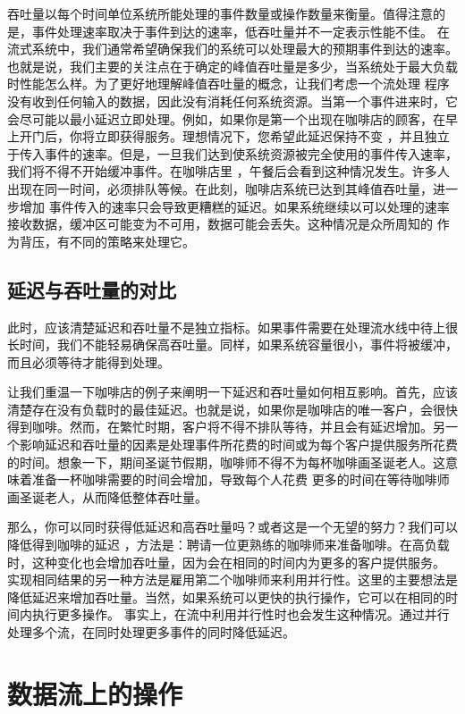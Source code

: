 \documentclass[cn,11pt,chinese]{elegantbook}
\begin{document}
吞吐量以每个时间单位系统所能处理的事件数量或操作数量来衡量。值得注意的是，事件处理速率取决于事件到达的速率，低吞吐量并不一定表示性能不佳。 在流式系统中，我们通常希望确保我们的系统可以处理最大的预期事件到达的速率。也就是说，我们主要的关注点在于确定的峰值吞吐量是多少，当系统处于最大负载时性能怎么样。为了更好地理解峰值吞吐量的概念，让我们考虑一个流处理 程序没有收到任何输入的数据，因此没有消耗任何系统资源。当第一个事件进来时，它会尽可能以最小延迟立即处理。例如，如果你是第一个出现在咖啡店的顾客，在早上开门后，你将立即获得服务。理想情况下，您希望此延迟保持不变 ，并且独立于传入事件的速率。但是，一旦我们达到使系统资源被完全使用的事件传入速率，我们将不得不开始缓冲事件。在咖啡店里 ，午餐后会看到这种情况发生。许多人出现在同一时间，必须排队等候。在此刻，咖啡店系统已达到其峰值吞吐量，进一步增加 事件传入的速率只会导致更糟糕的延迟。如果系统继续以可以处理的速率接收数据，缓冲区可能变为不可用，数据可能会丢失。这种情况是众所周知的 作为背压，有不同的策略来处理它。

\subsection{延迟与吞吐量的对比}

此时，应该清楚延迟和吞吐量不是独立指标。如果事件需要在处理流水线中待上很长时间，我们不能轻易确保高吞吐量。同样，如果系统容量很小，事件将被缓冲，而且必须等待才能得到处理。

让我们重温一下咖啡店的例子来阐明一下延迟和吞吐量如何相互影响。首先，应该清楚存在没有负载时的最佳延迟。也就是说，如果你是咖啡店的唯一客户，会很快得到咖啡。然而，在繁忙时期，客户将不得不排队等待，并且会有延迟增加。另一个影响延迟和吞吐量的因素是处理事件所花费的时间或为每个客户提供服务所花费的时间。想象一下，期间圣诞节假期，咖啡师不得不为每杯咖啡画圣诞老人。这意味着准备一杯咖啡需要的时间会增加，导致每个人花费 更多的时间在等待咖啡师画圣诞老人，从而降低整体吞吐量。

那么，你可以同时获得低延迟和高吞吐量吗？或者这是一个无望的努力？我们可以降低得到咖啡的延迟 ，方法是：聘请一位更熟练的咖啡师来准备咖啡。在高负载时，这种变化也会增加吞吐量，因为会在相同的时间内为更多的客户提供服务。 实现相同结果的另一种方法是雇用第二个咖啡师来利用并行性。这里的主要想法是降低延迟来增加吞吐量。当然，如果系统可以更快的执行操作，它可以在相同的时间内执行更多操作。 事实上，在流中利用并行性时也会发生这种情况。通过并行处理多个流，在同时处理更多事件的同时降低延迟。

\section{数据流上的操作}
\end{document}
